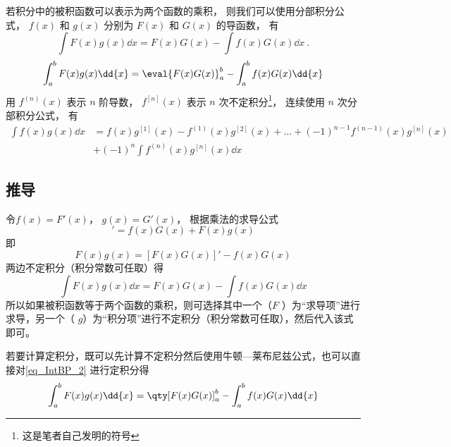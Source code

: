 

若积分中的被积函数可以表示为两个函数的乘积， 则我们可以使用分部积分公式， $f(x)$ 和 $g(x)$ 分别为 $F(x)$ 和 $G(x)$ 的导函数， 有
\begin{equation}\label{eq_IntBP_1}
\int F(x)g(x)\dd{x}  = F(x)G(x) - \int f(x)G(x)\dd{x}~.
\end{equation}
\begin{equation}
\int_a^b F(x)g(x) \dd{x}  = \eval{F(x)G(x)}_a^b - \int_a^b f(x)G(x) \dd{x}
\end{equation}
用 $f^{(n)}(x)$ 表示 $n$ 阶导数，  $f^{[n]}(x)$ 表示 $n$ 次不定积分\footnote{这是笔者自己发明的符号}， 连续使用 $n$ 次分部积分公式， 有
\begin{equation}
\begin{aligned}
\int f(x)g(x) \dd{x} &= f(x)g^{[1]}(x) - f^{(1)}(x)g^{[2]}(x) + \dots + (-1)^{n-1} f^{(n-1)}(x) g^{[n]}(x)\\
 &+ (-1)^n \int f^{(n)}(x) g^{[n]}(x) \dd{x}
\end{aligned}
\end{equation}

\subsection{推导}
令$f(x) = F'(x)$，  $g(x) = G'(x)$， 根据乘法的求导公式%
\begin{equation}
[F(x)G(x)]' = f(x)G(x) + F(x)g(x)
\end{equation}
即
\begin{equation}\label{eq_IntBP_2}
F(x)g(x) = [F(x)G(x)]' - f(x)G(x)
\end{equation}
两边不定积分（积分常数可任取）得
\begin{equation}\label{eq_IntBP_6}
\int F(x)g(x) \dd{x}  = F(x)G(x) - \int f(x)G(x) \dd{x}
\end{equation}
所以如果被积函数等于两个函数的乘积，则可选择其中一个（$F$ ）为“求导项”进行求导，另一个（ $g$）为“积分项”进行不定积分（积分常数可任取），然后代入该式即可。

若要计算定积分，既可以先计算不定积分然后使用牛顿—莱布尼兹公式，也可以直接对\autoref{eq_IntBP_2} 进行定积分得
\begin{equation}\label{eq_IntBP_4}
\int_a^b F(x)g(x) \dd{x}  = \qty[ F(x)G(x) ]_a^b - \int_a^b f(x)G(x) \dd{x}
\end{equation}

